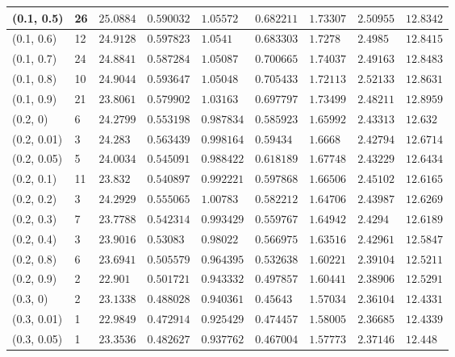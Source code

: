 \begin{center}
{\begin{longtable}{| l | p{} |  p{} | p{} | p{} | p{} | p{} | p{} | p{} |}
 (0.1, 0.5) & 26  & $25.0884$ & $0.590032$ & $1.05572$ & $0.682211$ & $1.73307$ & $2.50955$ & $12.8342$ \\ \hline
 (0.1, 0.6) & 12  & $24.9128$ & $0.597823$ & $1.0541$ & $0.683303$ & $1.7278$ & $2.4985$ & $12.8415$ \\ \hline
 (0.1, 0.7) & 24  & $24.8841$ & $0.587284$ & $1.05087$ & $0.700665$ & $1.74037$ & $2.49163$ & $12.8483$ \\ \hline
 (0.1, 0.8) & 10  & $24.9044$ & $0.593647$ & $1.05048$ & $0.705433$ & $1.72113$ & $2.52133$ & $12.8631$ \\ \hline
 (0.1, 0.9) & 21  & $23.8061$ & $0.579902$ & $1.03163$ & $0.697797$ & $1.73499$ & $2.48211$ & $12.8959$ \\ \hline
 (0.2, 0) & 6  & $24.2799$ & $0.553198$ & $0.987834$ & $0.585923$ & $1.65992$ & $2.43313$ & $12.632$ \\ \hline
 (0.2, 0.01) & 3  & $24.283$ & $0.563439$ & $0.998164$ & $0.59434$ & $1.6668$ & $2.42794$ & $12.6714$ \\ \hline
 (0.2, 0.05) & 5  & $24.0034$ & $0.545091$ & $0.988422$ & $0.618189$ & $1.67748$ & $2.43229$ & $12.6434$ \\ \hline
 (0.2, 0.1) & 11  & $23.832$ & $0.540897$ & $0.992221$ & $0.597868$ & $1.66506$ & $2.45102$ & $12.6165$ \\ \hline
 (0.2, 0.2) & 3  & $24.2929$ & $0.555065$ & $1.00783$ & $0.582212$ & $1.64706$ & $2.43987$ & $12.6269$ \\ \hline
 (0.2, 0.3) & 7  & $23.7788$ & $0.542314$ & $0.993429$ & $0.559767$ & $1.64942$ & $2.4294$ & $12.6189$ \\ \hline
 (0.2, 0.4) & 3  & $23.9016$ & $0.53083$ & $0.98022$ & $0.566975$ & $1.63516$ & $2.42961$ & $12.5847$ \\ \hline
 (0.2, 0.8) & 6  & $23.6941$ & $0.505579$ & $0.964395$ & $0.532638$ & $1.60221$ & $2.39104$ & $12.5211$ \\ \hline
 (0.2, 0.9) & 2  & $22.901$ & $0.501721$ & $0.943332$ & $0.497857$ & $1.60441$ & $2.38906$ & $12.5291$ \\ \hline
 (0.3, 0) & 2  & $23.1338$ & $0.488028$ & $0.940361$ & $0.45643$ & $1.57034$ & $2.36104$ & $12.4331$ \\ \hline
 (0.3, 0.01) & 1  & $22.9849$ & $0.472914$ & $0.925429$ & $0.474457$ & $1.58005$ & $2.36685$ & $12.4339$ \\ \hline
 (0.3, 0.05) & 1  & $23.3536$ & $0.482627$ & $0.937762$ & $0.467004$ & $1.57773$ & $2.37146$ & $12.448$ \\ \hline

\end{longtable}}
\end{center}
